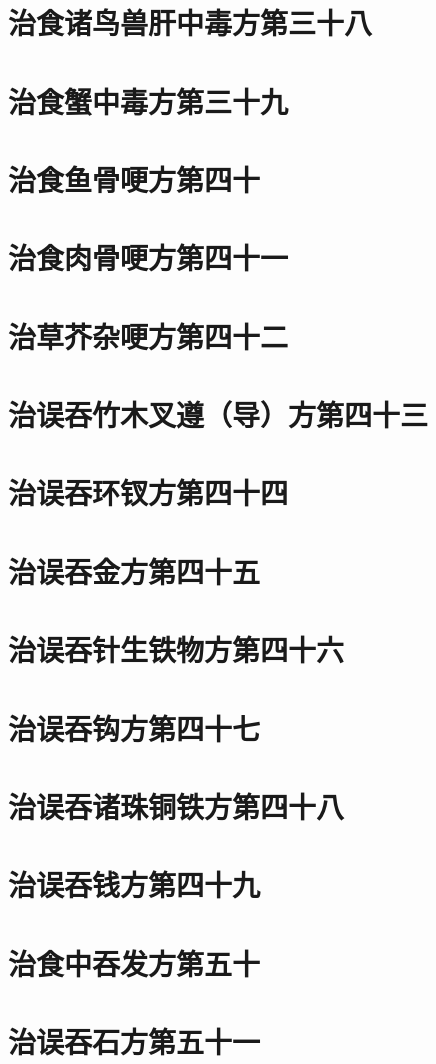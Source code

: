 \documentclass[a4paper,12pt,UTF8,twoside]{ctexbook}
\begin{document}
\chapter{治食诸鸟兽肝中毒方第三十八}
\chapter{治食蟹中毒方第三十九}
\chapter{治食鱼骨哽方第四十}
\chapter{治食肉骨哽方第四十一}
\chapter{治草芥杂哽方第四十二}
\chapter{治误吞竹木叉遵（导）方第四十三}
\chapter{治误吞环钗方第四十四}
\chapter{治误吞金方第四十五}
\chapter{治误吞针生铁物方第四十六}
\chapter{治误吞钩方第四十七}
\chapter{治误吞诸珠铜铁方第四十八}
\chapter{治误吞钱方第四十九}
\chapter{治食中吞发方第五十}
\chapter{治误吞石方第五十一}
\end{document}
